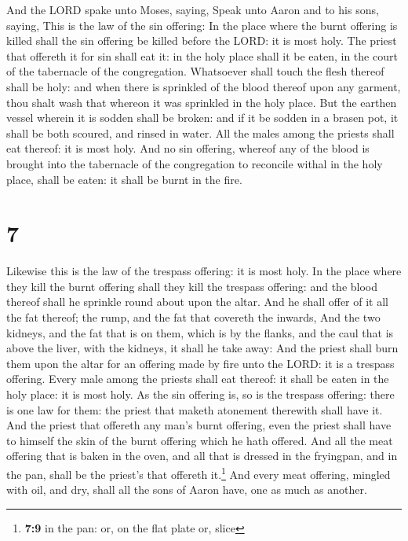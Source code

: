  And the LORD spake unto Moses, saying, 
Speak unto Aaron and to his sons, saying, This is the law of the sin
offering: In the place where the burnt offering is killed shall the sin
offering be killed before the LORD: it is most holy.  The
priest that offereth it for sin shall eat it: in the holy place shall it
be eaten, in the court of the tabernacle of the congregation.
 Whatsoever shall touch the flesh thereof shall be holy:
and when there is sprinkled of the blood thereof upon any garment, thou
shalt wash that whereon it was sprinkled in the holy place.
 But the earthen vessel wherein it is sodden shall be
broken: and if it be sodden in a brasen pot, it shall be both scoured,
and rinsed in water.  All the males among the priests
shall eat thereof: it is most holy.  And no sin offering,
whereof any of the blood is brought into the tabernacle of the
congregation to reconcile withal in the holy place, shall be eaten: it
shall be burnt in the fire.

\hypertarget{section-6}{%
\section{7}\label{section-6}}

 Likewise this is the law of the trespass offering: it is
most holy.  In the place where they kill the burnt
offering shall they kill the trespass offering: and the blood thereof
shall he sprinkle round about upon the altar.  And he
shall offer of it all the fat thereof; the rump, and the fat that
covereth the inwards,  And the two kidneys, and the fat
that is on them, which is by the flanks, and the caul that is above the
liver, with the kidneys, it shall he take away:  And the
priest shall burn them upon the altar for an offering made by fire unto
the LORD: it is a trespass offering.  Every male among the
priests shall eat thereof: it shall be eaten in the holy place: it is
most holy.  As the sin offering is, so is the trespass
offering: there is one law for them: the priest that maketh atonement
therewith shall have it.  And the priest that offereth any
man's burnt offering, even the priest shall have to himself the skin of
the burnt offering which he hath offered.  And all the
meat offering that is baken in the oven, and all that is dressed in the
fryingpan, and in the pan, shall be the priest's that offereth
it.\footnote{\textbf{7:9} in the pan: or, on the flat plate or, slice}
 And every meat offering, mingled with oil, and dry,
shall all the sons of Aaron have, one as much as another.

